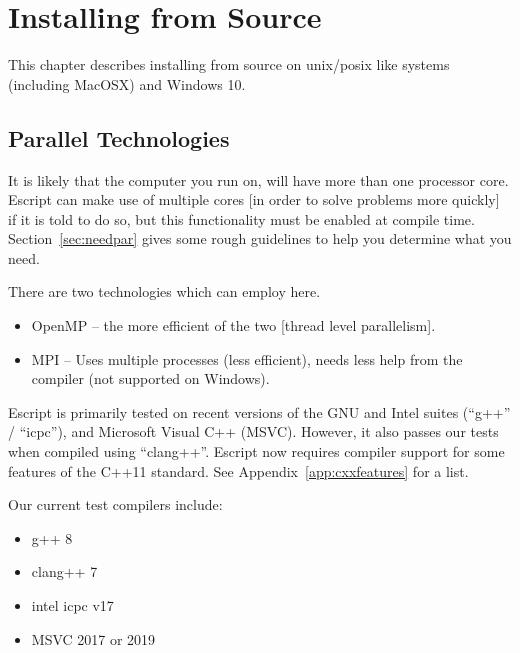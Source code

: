 %
%
%


\chapter{Installing from Source}\label{chap:source}

This chapter describes installing \escript from source on unix/posix like
systems (including MacOSX) and Windows 10.

\section{Parallel Technologies}\label{sec:par}
It is likely that the computer you run \escript on, will have more than one processor core.
Escript can make use of multiple cores [in order to solve problems more quickly] if it is told to do so,
but this functionality must be enabled at compile time.
Section~\ref{sec:needpar} gives some rough guidelines to help you determine what you need.

There are two technologies which \escript can employ here.
\begin{itemize}
 \item OpenMP -- the more efficient of the two [thread level parallelism].
 \item MPI -- Uses multiple processes (less efficient), needs less help from
   the compiler (not supported on Windows).
\end{itemize}

Escript is primarily tested on recent versions of the GNU and Intel suites
(``g++'' / ``icpc''), and Microsoft Visual C++ (MSVC).  However, it also passes
our tests when compiled using ``clang++''.  Escript now requires compiler
support for some features of the C++11 standard.  See
Appendix~\ref{app:cxxfeatures} for a list.


Our current test compilers include:
\begin{itemize}
 \item g++ 8
 \item clang++ 7
 \item intel icpc v17
 \item MSVC 2017 or 2019
\end{itemize}

